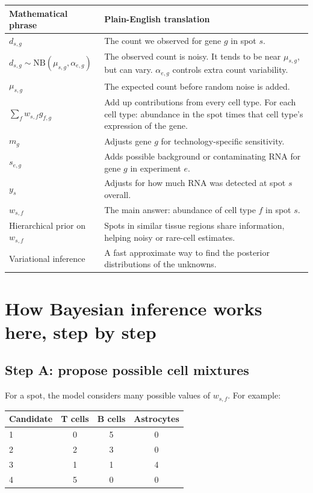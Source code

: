 \documentclass[11pt]{article}
\newcommand{\NB}{\mathrm{NB}}
\begin{document}
\begin{longtable}{p{}p{}}
\toprule
Mathematical phrase & Plain-English translation \\
\midrule
$d_{s,g}$ & The count we observed for gene $g$ in spot $s$. \\
$d_{s,g}\sim \NB(\mu_{s,g},\alpha_{e,g})$ & The observed count is noisy. It tends to be near $\mu_{s,g}$, but can vary. $\alpha_{e,g}$ controls extra count variability. \\
$\mu_{s,g}$ & The expected count before random noise is added. \\
$\sum_f w_{s,f}g_{f,g}$ & Add up contributions from every cell type. For each cell type: abundance in the spot times that cell type's expression of the gene. \\
$m_g$ & Adjusts gene $g$ for technology-specific sensitivity. \\
$s_{e,g}$ & Adds possible background or contaminating RNA for gene $g$ in experiment $e$. \\
$y_s$ & Adjusts for how much RNA was detected at spot $s$ overall. \\
$w_{s,f}$ & The main answer: abundance of cell type $f$ in spot $s$. \\
Hierarchical prior on $w_{s,f}$ & Spots in similar tissue regions share information, helping noisy or rare-cell estimates. \\
Variational inference & A fast approximate way to find the posterior distributions of the unknowns. \\
\bottomrule
\end{longtable}

\section{How Bayesian inference works here, step by step}

\subsection{Step A: propose possible cell mixtures}

For a spot, the model considers many possible values of $w_{s,f}$. For example:

\begin{center}
\begin{tabular}{lccc}
\toprule
Candidate & T cells & B cells & Astrocytes \\
\midrule
1 & 0 & 5 & 0 \\
2 & 2 & 3 & 0 \\
3 & 1 & 1 & 4 \\
4 & 5 & 0 & 0 \\
\bottomrule
\end{tabular}
\end{center}
\end{document}
